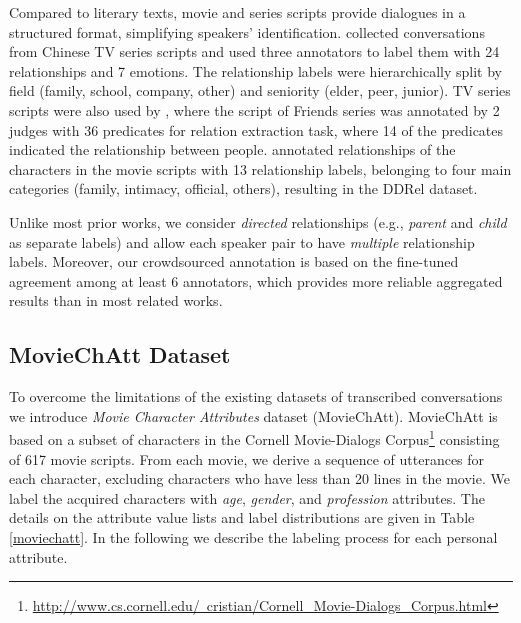 Compared to literary texts, movie and series scripts provide dialogues in a structured format, simplifying speakers' identification. \citet{chen2020mpdd} collected conversations from Chinese TV series scripts and used three annotators to label them with 24 relationships and 7 emotions. The relationship labels were hierarchically split by field (family, school, company, other) and seniority (elder, peer, junior). TV series scripts were also used by \citet{yu-etal-2020-dialogue}, where the script of Friends series was annotated by 2 judges with 36 predicates for relation extraction task, where 14 of the predicates indicated the relationship between people. \citet{jia2020ddrel} annotated relationships of the characters in the movie scripts with 13 relationship labels, belonging to four main categories (family, intimacy, official, others), resulting in the DDRel dataset. 

Unlike most prior works, we consider \emph{directed} relationships (e.g., \emph{parent} and \emph{child} as separate labels) and allow each speaker pair to have \emph{multiple} relationship labels. Moreover, our crowdsourced annotation is based on the fine-tuned agreement among at least 6 annotators, which provides more reliable aggregated results than in most related works.

\subsection{MovieChAtt Dataset}

To overcome the limitations of the existing datasets of transcribed conversations we introduce \textit{Movie Character Attributes} dataset (MovieChAtt).
MovieChAtt is based on a subset of characters in the Cornell Movie-Dialogs Corpus\footnote{\href{https://www.cs.cornell.edu/~cristian/Cornell_Movie-Dialogs_Corpus.html}{http://www.cs.cornell.edu/~cristian/Cornell\_Movie-Dialogs\_Corpus.html}} \cite{danescu2011chameleons} consisting of 617 movie scripts. From each movie, we derive a sequence of utterances for each character, excluding characters who have less than 20 lines in the movie. We label the acquired characters with \textit{age}, \textit{gender}, and \textit{profession} attributes. The details on the attribute value lists and label distributions are given in Table \ref{moviechatt}. In the following we describe the labeling process for each personal attribute.


